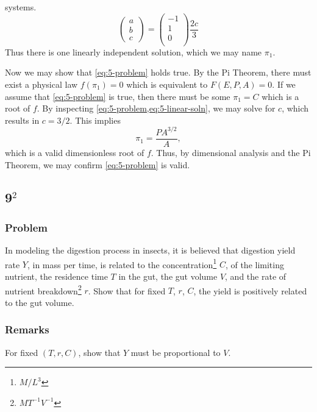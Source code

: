 \documentclass[12pt]{article}
\begin{document}
  systems.
  \begin{equation}
    \label{eq:5-linear-soln}
    \begin{pmatrix}
      a \\ b \\ c \
    \end{pmatrix} =
    \begin{pmatrix}
      -1 \\
      1 \\
      0 \\
    \end{pmatrix}\frac{2c}{3}
  \end{equation}
  Thus there is one linearly independent solution, which we may name $\pi_1$.

  Now we may show that \cref{eq:5-problem} holds true. By the Pi Theorem, there
  must exist a physical law $f(\pi_1)=0$ which is equivalent to $F(E,P,A)=0$. If
  we assume that \cref{eq:5-problem} is true, then there must be some $\pi_1=C$
  which is a root of $f$. By inspecting \cref{eq:5-problem,eq:5-linear-soln}, we
  may solve for $c$, which results in $c=3/2$. This implies
  \begin{equation*}
    \pi_1 = \frac{PA^{3/2}}{A},
  \end{equation*}
  which is a valid dimensionless root of $f$. Thus, by dimensional analysis and
  the Pi Theorem, we may confirm \cref{eq:5-problem} is valid.

  \newpage
\subsection{9$^2$}
  \subsubsection*{Problem}
  In modeling the digestion process in insects, it is believed that digestion
  yield rate $Y$, in mass per time, is related to the
  concentration\footnote{$M/L^3$} $C$, of the limiting nutrient, the residence
  time $T$ in the gut, the gut volume $V$, and the rate of nutrient
  breakdown\footnote{$MT^{-1}V^{-1}$} $r$. Show that for fixed $T$, $r$, $C$,
  the yield is positively related to the gut volume.

  \subsubsection*{Remarks}
  For fixed $(T,r,C)$, show that $Y$ must be proportional to $V$.
\end{document}
